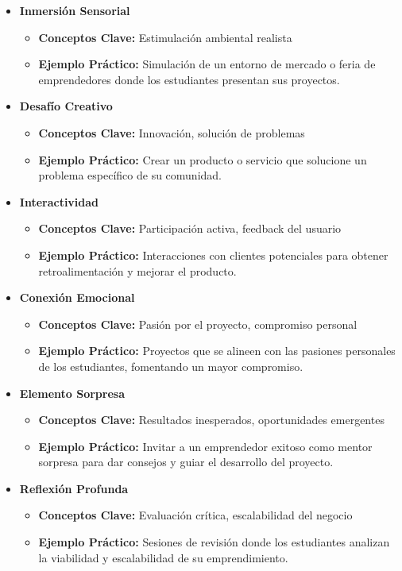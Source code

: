 \begin{itemize}[label={}]
    \item \textbf{Inmersión Sensorial}
    \begin{itemize}
        \item \textbf{Conceptos Clave:} Estimulación ambiental realista
        \item \textbf{Ejemplo Práctico:} Simulación de un entorno de mercado o feria de emprendedores donde los estudiantes presentan sus proyectos.
    \end{itemize}
    
    \item \textbf{Desafío Creativo}
    \begin{itemize}
        \item \textbf{Conceptos Clave:} Innovación, solución de problemas
        \item \textbf{Ejemplo Práctico:} Crear un producto o servicio que solucione un problema específico de su comunidad.
    \end{itemize}
    
    \item \textbf{Interactividad}
    \begin{itemize}
        \item \textbf{Conceptos Clave:} Participación activa, feedback del usuario
        \item \textbf{Ejemplo Práctico:} Interacciones con clientes potenciales para obtener retroalimentación y mejorar el producto.
    \end{itemize}
    
    \item \textbf{Conexión Emocional}
    \begin{itemize}
        \item \textbf{Conceptos Clave:} Pasión por el proyecto, compromiso personal
        \item \textbf{Ejemplo Práctico:} Proyectos que se alineen con las pasiones personales de los estudiantes, fomentando un mayor compromiso.
    \end{itemize}
    
    \item \textbf{Elemento Sorpresa}
    \begin{itemize}
        \item \textbf{Conceptos Clave:} Resultados inesperados, oportunidades emergentes
        \item \textbf{Ejemplo Práctico:} Invitar a un emprendedor exitoso como mentor sorpresa para dar consejos y guiar el desarrollo del proyecto.
    \end{itemize}
    
    \item \textbf{Reflexión Profunda}
    \begin{itemize}
        \item \textbf{Conceptos Clave:} Evaluación crítica, escalabilidad del negocio
        \item \textbf{Ejemplo Práctico:} Sesiones de revisión donde los estudiantes analizan la viabilidad y escalabilidad de su emprendimiento.
    \end{itemize}
\end{itemize}
